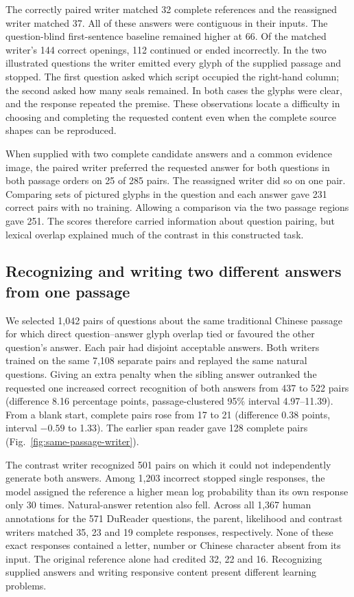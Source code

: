 \documentclass[12pt,a4paper]{article}
\providecommand{\DIFadd}[1]{{\protect\color{blue} \sf #1}} %
\begin{document}
\DIFadd{The correctly paired writer matched 32 complete references and the reassigned writer matched 37. All of these answers were contiguous in their inputs. The question-blind first-sentence baseline remained higher at 66. Of the matched writer's 144 correct openings, 112 continued or ended incorrectly. In the two illustrated questions the writer emitted every glyph of the supplied passage and stopped. The first question asked which script occupied the right-hand column; the second asked how many seals remained. In both cases the glyphs were clear, and the response repeated the premise. These observations locate a difficulty in choosing and completing the requested content even when the complete source shapes can be reproduced.
}

\DIFadd{When supplied with two complete candidate answers and a common evidence image, the paired writer preferred the requested answer for both questions in both passage orders on 25 of 285 pairs. The reassigned writer did so on one pair. Comparing sets of pictured glyphs in the question and each answer gave 231 correct pairs with no training. Allowing a comparison via the two passage regions gave 251. The scores therefore carried information about question pairing, but lexical overlap explained much of the contrast in this constructed task.
}

\subsection*{\DIFadd{Recognizing and writing two different answers from one passage}}
\DIFadd{We selected 1,042 pairs of questions about the same traditional Chinese passage for which direct question--answer glyph overlap tied or favoured the other question's answer. Each pair had disjoint acceptable answers. Both writers trained on the same 7,108 separate pairs and replayed the same natural questions. Giving an extra penalty when the sibling answer outranked the requested one increased correct recognition of both answers from 437 to 522 pairs (difference 8.16 percentage points, passage-clustered 95\% interval 4.97--11.39). From a blank start, complete pairs rose from 17 to 21 (difference 0.38 points, interval $-0.59$ to 1.33). The earlier span reader gave 128 complete pairs (Fig.~\ref{fig:same-passage-writer}).
}

\DIFadd{The contrast writer recognized 501 pairs on which it could not independently generate both answers. Among 1,203 incorrect stopped single responses, the model assigned the reference a higher mean log probability than its own response only 30 times. Natural-answer retention also fell. Across all 1,367 human annotations for the 571 DuReader questions, the parent, likelihood and contrast writers matched 35, 23 and 19 complete responses, respectively. None of these exact responses contained a letter, number or Chinese character absent from its input. The original reference alone had credited 32, 22 and 16. Recognizing supplied answers and writing responsive content present different learning problems.
}
\end{document}
